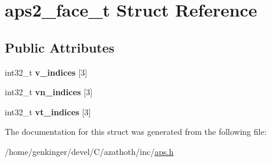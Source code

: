 \hypertarget{structaps2__face__t}{}\section{aps2\+\_\+face\+\_\+t Struct Reference}
\label{structaps2__face__t}
\subsection*{Public Attributes}
\begin{DoxyCompactItemize}
\item 
\mbox{\label{structaps2__face__t_af4b31d5deddcc6bd78954adef0bbd26a}} 
int32\+\_\+t {\bfseries v\+\_\+indices} \mbox{[}3\mbox{]}
\item 
\mbox{\label{structaps2__face__t_ad45578c9dc815a8c50e8daac78dae18f}} 
int32\+\_\+t {\bfseries vn\+\_\+indices} \mbox{[}3\mbox{]}
\item 
\mbox{\label{structaps2__face__t_adf93f9199bf87266ab8d93d295975df8}} 
int32\+\_\+t {\bfseries vt\+\_\+indices} \mbox{[}3\mbox{]}
\end{DoxyCompactItemize}


The documentation for this struct was generated from the following file\+:\begin{DoxyCompactItemize}
\item 
/home/genkinger/devel/\+C/azathoth/inc/\mbox{\hyperlink{aps_8h}{aps.\+h}}\end{DoxyCompactItemize}
